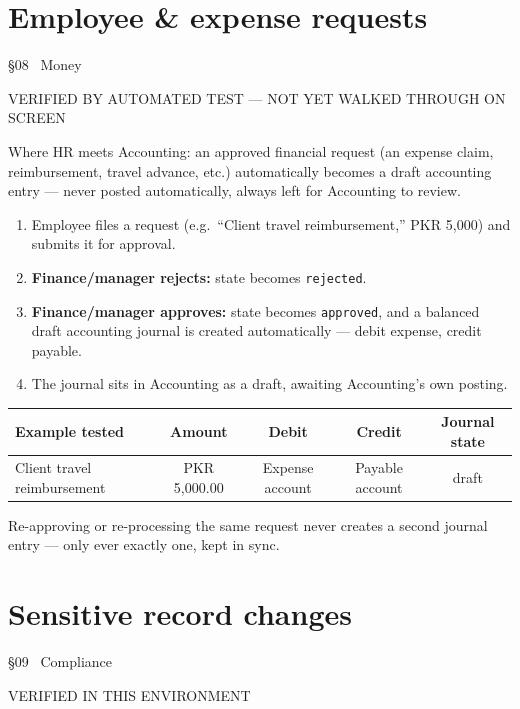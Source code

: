 \documentclass[11pt,a4paper]{article}
\newcommand{\eyebrow}[1]{{\small\ttfamily\color{accentdark} #1}\par\vspace{2pt}}
\begin{document}
\section{Employee \& expense requests}
\eyebrow{\S08 \textperiodcentered\ Money}
\begin{statusbox}{VERIFIED BY AUTOMATED TEST --- NOT YET WALKED THROUGH ON SCREEN}\end{statusbox}

Where HR meets Accounting: an approved financial request (an expense claim, reimbursement, travel advance, etc.) automatically becomes a draft accounting entry --- never posted automatically, always left for Accounting to review.

\begin{enumerate}[leftmargin=1.8em]
  \item Employee files a request (e.g.\ ``Client travel reimbursement,'' PKR 5{,}000) and submits it for approval.
  \item \textbf{Finance/manager rejects:} state becomes \texttt{rejected}.
  \item \textbf{Finance/manager approves:} state becomes \texttt{approved}, and a balanced draft accounting journal is created automatically --- debit expense, credit payable.
  \item The journal sits in Accounting as a draft, awaiting Accounting's own posting.
\end{enumerate}

\begin{center}
\small
\begin{tabular}{@{}lcccc@{}}
\toprule
\textbf{Example tested} & \textbf{Amount} & \textbf{Debit} & \textbf{Credit} & \textbf{Journal state} \\
\midrule
Client travel reimbursement & PKR 5{,}000.00 & Expense account & Payable account & draft \\
\bottomrule
\end{tabular}
\end{center}

\begin{note}
Re-approving or re-processing the same request never creates a second journal entry --- only ever exactly one, kept in sync.
\end{note}

\section{Sensitive record changes}
\eyebrow{\S09 \textperiodcentered\ Compliance}
\begin{statusbox}{VERIFIED IN THIS ENVIRONMENT}\end{statusbox}
\end{document}
